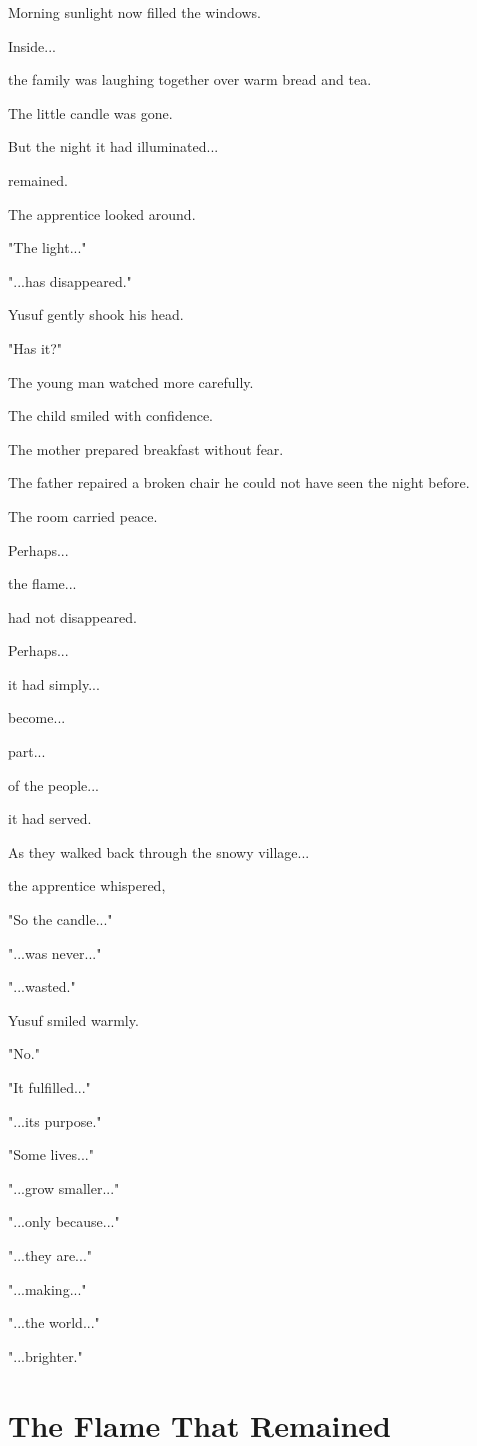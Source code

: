 \documentclass[12pt,openany]{book}
\begin{document}
Morning sunlight now filled the windows.

Inside...

the family was laughing together over warm bread and tea.

The little candle was gone.

But the night it had illuminated...

remained.

The apprentice looked around.

"The light..."

"...has disappeared."

Yusuf gently shook his head.

"Has it?"

The young man watched more carefully.

The child smiled with confidence.

The mother prepared breakfast without fear.

The father repaired a broken chair he could not have seen the night before.

The room carried peace.

Perhaps...

the flame...

had not disappeared.

Perhaps...

it had simply...

become...

part...

of the people...

it had served.

As they walked back through the snowy village...

the apprentice whispered,

"So the candle..."

"...was never..."

"...wasted."

Yusuf smiled warmly.

"No."

"It fulfilled..."

"...its purpose."

"Some lives..."

"...grow smaller..."

"...only because..."

"...they are..."

"...making..."

"...the world..."

"...brighter."
\section*{The Flame That Remained}
\end{document}
